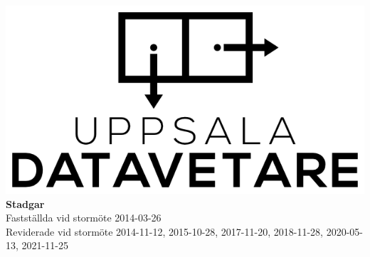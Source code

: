 \documentclass[a4paper]{article}
\begin{document}
\begin{titlepage}
  \vspace*{\fill}
  \centering
  \vfill
  \vfill
  \includegraphics[width=\textwidth]{UD_center.png}
  {\huge\textbf{Stadgar}\\
    \vspace{0.3em}
    \large{Fastställda vid stormöte 2014-03-26\\
      Reviderade vid stormöte 2014-11-12, 2015-10-28, 2017-11-20, 2018-11-28, 2020-05-13, 2021-11-25}}
  \vfill
  \vfill
  \vspace*{\fill}
\end{titlepage}
\renewcommand{\contentsname}{Innehåll\hfill\small Sida}
\tableofcontents
\cleardoublepage 
\setcounter{page}{1}
\cfoot{\thepage}
\end{document}
